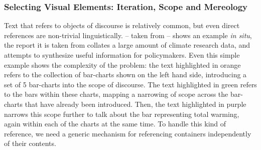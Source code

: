 \subsubsection{Selecting Visual Elements: Iteration, Scope and Mereology}
Text that refers to objects of discourse is relatively common, but even direct references are non-trivial
linguistically.  -- taken from \cite{lee23} -- shows an example \textit{in situ},
the report it is taken from collates a large amount of climate research data, and attempts to synthesize
useful information for policymakers. Even this simple example shows the complexity of the problem: the text highlighted
in orange refers to the collection of bar-charts shown on the left hand side, introducing a set of 5 bar-charts
into the scope of discourse. The text highlighted in green refers to the bars within these charts, mapping
a narrowing of scope across the bar-charts that have already been introduced. Then, the text highlighted in
purple narrows this scope further to talk about the bar representing total warming, again within each of the
charts at the same time. To handle this kind of reference, we need a generic mechanism for referencing
containers independently of their contents.



